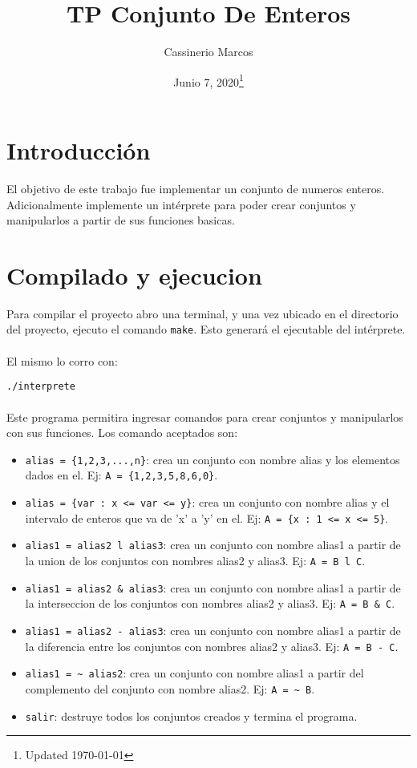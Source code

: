 \documentclass[]{article}
\begin{document}
	
\title{TP Conjunto De Enteros}
\author{Cassinerio Marcos}
\date{Junio 7, 2020\footnote{Updated \today}}
\maketitle
\newpage

\section{Introducción}
El objetivo de este trabajo fue implementar un conjunto de numeros enteros. Adicionalmente implemente un intérprete para poder crear conjuntos y manipularlos a partir de sus funciones basicas. 

\section{Compilado y ejecucion}
Para compilar el proyecto abro una terminal, y una vez ubicado en el directorio del proyecto, ejecuto el comando \verb|make|. Esto generará el ejecutable del intérprete.\\\\
El mismo lo corro con: 

\verb|./interprete|
\\\\Este programa permitira ingresar comandos para crear conjuntos y manipularlos con sus funciones. Los comando aceptados son:
 \begin{itemize}
 	\item \verb|alias = {1,2,3,...,n}|: crea un conjunto con nombre alias y los elementos dados en el. Ej: \verb|A = {1,2,3,5,8,6,0}|.
 	\item \verb|alias = {var : x <= var <= y}|: crea un conjunto con nombre alias y el intervalo de enteros que va de 'x' a 'y' en el. Ej: \verb|A = {x : 1 <= x <= 5}|.
 	\item \verb|alias1 = alias2 l alias3|: crea un conjunto con nombre alias1 a partir de la union de los conjuntos con nombres alias2 y alias3. Ej: \verb|A = B l C|.
 	\item \verb|alias1 = alias2 & alias3|: crea un conjunto con nombre alias1 a partir de la interseccion de los conjuntos con nombres alias2 y alias3. Ej: \verb|A = B & C|.
 	\item \verb|alias1 = alias2 - alias3|: crea un conjunto con nombre alias1 a partir de la diferencia entre los conjuntos con nombres alias2 y alias3. Ej: \verb|A = B - C|.
    \item \verb|alias1 = ~ alias2|: crea un conjunto con nombre alias1 a partir del complemento del conjunto con nombre alias2. Ej: \verb|A = ~ B|.
 	\item \verb|salir|: destruye todos los conjuntos creados y termina el programa.
 \end{itemize}
\end{document}
